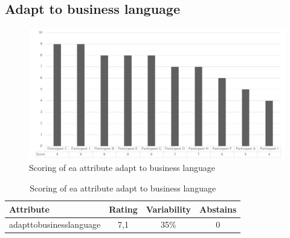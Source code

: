 \subsection{Adapt to business language}
\begin{figure}[H]
	\centering
	\includegraphics[width=0.9\linewidth]{images/scoreeaadapttobusinesslanguage}
	\caption[Scoring of \gls{ea} attribute adapt to business language]{Scoring of \gls{ea} attribute adapt to business language}
	\label{fig:appscoringeaadapttobusinesslanguage}
\end{figure}
\begin{table}[H]
	\centering
	\begin{tabular}{p{}ccc}
		\toprule
		\textbf{Attribute} & \textbf{Rating} & \textbf{Variability} & \textbf{Abstains} \\
		\midrule
		\Gls{adapttobusinesslanguage} & 7,1 & 35\% & 0 \\%
		\bottomrule
	\end{tabular}%
	\caption[Scoring of \gls{ea} attribute adapt to business language]{Scoring of \gls{ea} attribute adapt to business language}
	\label{tab:appscoringeaadapttobusinesslanguage}%
\end{table}%
\newpage
